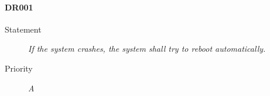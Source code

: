 \paragraph{DR001}
  \begin{description}
  \item [Statement] 
    \textit{ If the system crashes, the system shall try to reboot automatically.}
  \item [Priority] \textit{A}
\end{description}